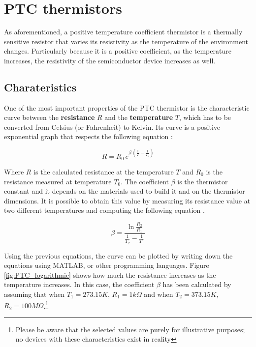 \section{PTC thermistors}
As aforementioned, a positive temperature coefficient thermistor is a thermally sensitive resistor that varies its resistivity as the temperature of the environment changes. Particularly because it is a positive coefficient, as the temperature increases, the resistivity of the semiconductor device increases as well.

\subsection{Charateristics}
One of the most important properties of the PTC thermistor is the characteristic curve between the \textbf{resistance} $R$ and the \textbf{temperature} $T$, which has to be converted from Celsius (or Fahrenheit) to Kelvin. Its curve is a positive exponential graph that respects the following equation \cite{Saburi196353}:

\begin{equation*}
    R = R_0\,e^{\beta\,(\frac{1}{T} - \frac{1}{T_0})}
\end{equation*}

\noindent Where $R$ is the calculated resistance at the temperature $T$ and $R_0$ is the resistance measured at temperature $T_0$. The coefficient $\beta$ is the thermistor constant and it depends on the materials used to build it and on the thermistor dimensions. It is possible to obtain this value by measuring its resistance value at two different temperatures and computing the following equation \cite{Saburi196353}.

\begin{equation*}
    \beta = \frac{\ln{\frac{R_2}{R_1}}}{\frac{1}{T_2} - \frac{1}{T_1}}
\end{equation*}

\noindent Using the previous equations, the curve can be plotted by writing down the equations using MATLAB, or other programming languages. Figure \ref{fig:PTC_logarithmic} shows how much the resistance increases as the temperature increases. In this case, the coefficient $\beta$ has been calculated by assuming that when $T_1 = 273.15 K$, $R_1 = 1k\Omega$ and when $T_2 = 373.15 K$, $R_2 = 100M\Omega$.\footnote{Please be aware that the selected values are purely for illustrative purposes; no devices with these characteristics exist in reality}

